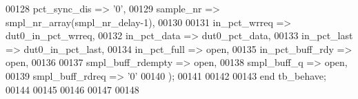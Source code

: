 \begin{DoxyCode}
00128       pct_sync_dis      => '0',
00129       sample_nr         => smpl_nr_array\textcolor{vhdlchar}{(}smpl_nr_delay-\textcolor{vhdllogic}{1}\textcolor{vhdlchar}{)},
00130       
00131       in_pct_wrreq      => dut0_in_pct_wrreq,
00132       in_pct_data       => dut0_pct_data,
00133       in_pct_last       => dut0_in_pct_last,
00134       in_pct_full       => \textcolor{keywordflow}{open},
00135       in_pct_buff_rdy   => \textcolor{keywordflow}{open}, 
00136       
00137       smpl_buff_rdempty => \textcolor{keywordflow}{open},
00138       smpl_buff_q       => \textcolor{keywordflow}{open},    
00139       smpl_buff_rdreq   => '0'
00140         \textcolor{vhdlchar}{)};
00141       
00142     
00143     \textcolor{keywordflow}{end} \textcolor{vhdlchar}{tb\_behave};
00144   
00145   
00146 
00147 
00148   
\end{DoxyCode}
